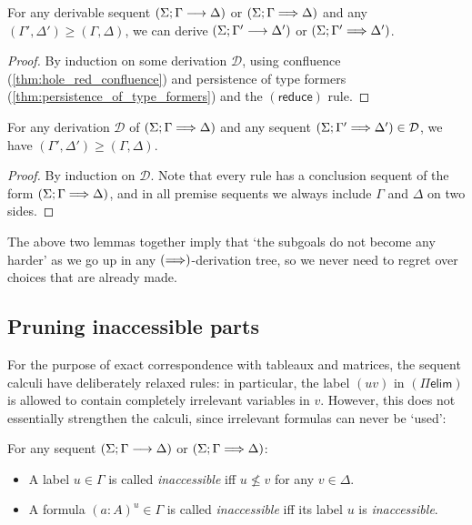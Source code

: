 \documentclass[twoside]{report}
\begin{document}
\begin{proposition}[Weakening]
    \label{thm:sequent_calculi_weakening}
    For any derivable sequent $(\Sigma; \Gamma \longrightarrow \Delta)$ or $(\Sigma; \Gamma \Longrightarrow \Delta)$ and any $(\Gamma', \Delta') \geq (\Gamma, \Delta)$, we can derive $(\Sigma; \Gamma' \longrightarrow \Delta')$ or $(\Sigma; \Gamma' \Longrightarrow \Delta')$.
\end{proposition}

\begin{proof}
    By induction on some derivation $\mathcal D$, using confluence (\cref{thm:hole_red_confluence}) and persistence of type formers (\cref{thm:persistence_of_type_formers}) and the $(\mathsf{reduce})$ rule.
\end{proof}

\begin{proposition}[Monotonicity]
    \label{thm:defocused_calculus_monotonicity}
    For any derivation $\mathcal D$ of $(\Sigma; \Gamma \Longrightarrow \Delta)$ and any sequent $(\Sigma; \Gamma' \Longrightarrow \Delta') \in \mathcal D$, we have $(\Gamma', \Delta') \geq (\Gamma, \Delta)$.
\end{proposition}

\begin{proof}
    By induction on $\mathcal D$. Note that every rule has a conclusion sequent of the form $(\Sigma; \Gamma \Longrightarrow \Delta)$, and in all premise sequents we always include $\Gamma$ and $\Delta$ on two sides.
\end{proof}

The above two lemmas together imply that `the subgoals do not become any harder' as we go up in any $(\Longrightarrow)$-derivation tree, so we never need to regret over choices that are already made.

\subsection*{Pruning inaccessible parts}

For the purpose of exact correspondence with tableaux and matrices, the sequent calculi have deliberately relaxed rules: in particular, the label $(uv)$ in $(\Pi\mathsf{elim})$ is allowed to contain completely irrelevant variables in $v$. However, this does not essentially strengthen the calculi, since irrelevant formulas can never be `used':

\begin{definition}
    \label{def:inaccessible_formulas}
    For any sequent $(\Sigma; \Gamma \longrightarrow \Delta)$ or $(\Sigma; \Gamma \Longrightarrow \Delta)$:
    \begin{itemize}[noitemsep]
        \item A label $u \in \Gamma$ is called \emph{inaccessible} iff $u \not\leq v$ for any $v \in \Delta$.
        \item A formula $(a : A)^u \in \Gamma$ is called \emph{inaccessible} iff its label $u$ is \emph{inaccessible}.
    \end{itemize}
\end{definition}
\end{document}
